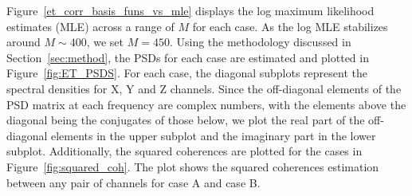 \documentclass[%
 reprint,
 amsmath,amssymb,
 aps,
 nofootinbib,
]{revtex4-2}
\begin{document}
Figure~\ref{et_corr_basis_funs_vs_mle} displays the log maximum
likelihood estimates (MLE) across a range of $M$ for each case.
As the log MLE stabilizes around $M\sim400$, we set $M=450$.
Using the methodology discussed in Section~\ref{sec:method}, the PSDs for each case are estimated and plotted in Figure~\ref{fig:ET_PSDS}. For each case, the diagonal subplots represent the spectral densities for X, Y and Z channels. Since the off-diagonal elements of the PSD matrix at each frequency are complex numbers, with the elements above the diagonal being the conjugates of those below, we plot the real part of the off-diagonal elements in the upper subplot and the imaginary part in the lower subplot.
Additionally, the squared coherences are plotted for the cases in Figure~\ref{fig:squared_coh}. The plot shows the squared coherences estimation between any pair of channels for case A and case B.
\end{document}
